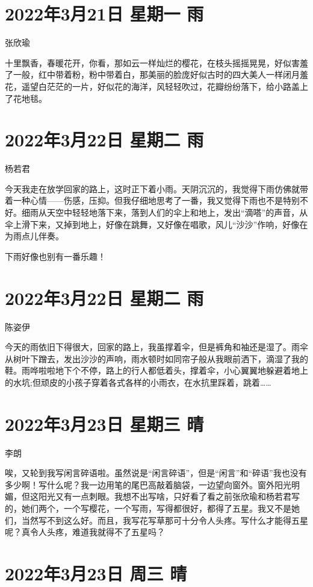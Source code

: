 \section{2022年3月21日 星期一 雨}

张欣瑜

十里飘香，春暖花开，你看，那如云一样灿烂的樱花，在枝头摇摇晃晃，好似害羞了一般，红中带着粉，粉中带着白，那美丽的脸庞好似古时的四大美人一样闭月羞花，遥望白茫茫的一片，好似花的海洋，风轻轻吹过，花瓣纷纷落下，给小路盖上了花地毯。

\section{2022年3月22日 星期二 雨}

杨若君

今天我走在放学回家的路上，这时正下着小雨。天阴沉沉的，我觉得下雨仿佛就带着一种心情——伤感，压抑。但我仔细地思考了一番，我又觉得下雨也不是特别不好。细雨从天空中轻轻地落下来，落到人们的伞上和地上，发出“滴嗒”的声音，从伞上滑下来，又掉到地上，好像在跳舞，又好像在唱歌，风儿“沙沙”作响，好像在为雨点儿伴奏。

下雨好像也别有一番乐趣！

\section{2022年3月22日 星期二 雨}

陈姿伊

今天的雨依旧下得很大，回家的路上，我虽撑着伞，但是裤角和袖还是湿了。雨伞从树叶下蹭去，发出沙沙的声响，雨水顿时如同帘子般从我眼前洒下，滴湿了我的鞋。雨哗啦啦地下个不停，路上的行人都低着头，撑着伞，小心翼翼地躲避着地上的水坑;但顽皮的小孩子穿着各式各样的小雨衣，在水抗里踩着，跳着……

\section{2022年3月23日 星期三 晴}

李朗

唉，又轮到我写闲言碎语啦。虽然说是“闲言碎语”，但是“闲言”和“碎语”我也没有多少啊！写什么呢？我一边用笔的尾巴高敲着脑袋，一边望向窗外。窗外阳光明媚，但这阳光又有一点刺眼。我想不出写啥，只好看了看之前张欣瑜和杨若君写的，她们两个，一个写樱花，一个写雨，写得都很好，都得了五星。我又不是她们，当然写不到这么好。而且，我写花写草那可十分令人头疼。写什么才能得五星呢？真令人头疼，难道我就得不了五星吗？

\section{2022年3月23日 周三 晴}

